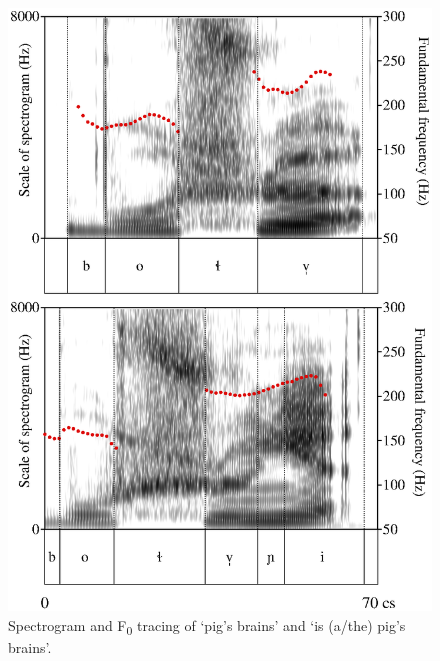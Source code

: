 \begin{figure}
\includegraphics[width=.70\textwidth]{figures/PigBrains/PigBrains.eps}
\caption{\label{fig:spectrogramandf0tracingoftwonaphrases}Spectrogram and F\textsubscript{0} tracing of  ‘pig’s brains’ and ‘is \mbox{(a/the)} pig’s brains’.}
\end{figure}


